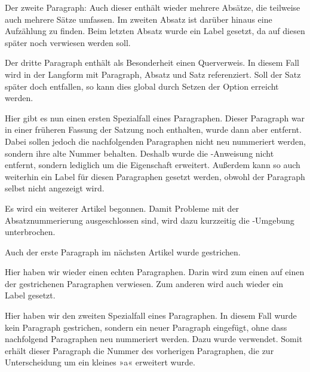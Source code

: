 %
Der zweite Paragraph: Auch dieser enthält wieder mehrere Absätze, die
teilweise auch mehrere Sätze umfassen. Im zweiten Absatz ist darüber hinaus
eine Aufzählung zu finden. Beim letzten Absatz wurde ein Label gesetzt, da auf
diesen später noch verwiesen werden soll.

%
Der dritte Paragraph enthält als Besonderheit einen Querverweis. In diesem
Fall wird in der Langform mit Paragraph, Absatz und Satz referenziert. Soll
der Satz später doch entfallen, so kann dies global durch Setzen der Option
 erreicht werden.

%
Hier gibt es nun einen ersten Spezialfall eines Paragraphen. Dieser Paragraph
war in einer früheren Fassung der Satzung noch enthalten, wurde dann aber
entfernt. Dabei sollen jedoch die nachfolgenden Paragraphen nicht neu
nummeriert werden, sondern ihre alte Nummer behalten. Deshalb wurde die
-Anweisung nicht entfernt, sondern lediglich um
die Eigenschaft  erweitert. Außerdem kann so auch weiterhin ein
Label für diesen Paragraphen gesetzt werden, obwohl der Paragraph selbst nicht
angezeigt wird.

%
Es wird ein weiterer Artikel begonnen. Damit Probleme mit der
Absatznummerierung ausgeschlossen sind, wird dazu kurzzeitig die
-Umgebung unterbrochen.

%
Auch der erste Paragraph im nächsten Artikel wurde gestrichen.

%
Hier haben wir wieder einen echten Paragraphen. Darin wird zum einen auf einen
der gestrichenen Paragraphen verwiesen. Zum anderen wird auch wieder ein Label
gesetzt.

%
Hier haben wir den zweiten Spezialfall eines Paragraphen. In diesem Fall wurde
kein Paragraph gestrichen, sondern ein neuer Paragraph eingefügt, ohne dass
nachfolgend Paragraphen neu nummeriert werden. Dazu wurde
 verwendet. Somit erhält dieser Paragraph
die Nummer des vorherigen Paragraphen, die zur Unterscheidung um ein kleines
»a« erweitert wurde.

